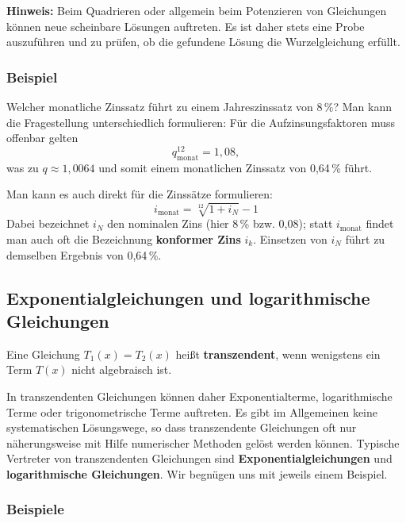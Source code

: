 \textbf{Hinweis:} Beim Quadrieren oder allgemein beim Potenzieren von Gleichungen können neue scheinbare Lösungen auftreten. Es ist daher stets eine Probe auszuführen und zu prüfen, ob die gefundene Lösung die Wurzelgleichung erfüllt.

\subsubsection{Beispiel}

Welcher monatliche Zinssatz führt zu einem Jahreszinssatz von 8\,\%? Man kann die Fragestellung unterschiedlich formulieren: Für die Aufzinsungsfaktoren muss offenbar gelten
\[ q_{\text{monat}}^{12} = 1{,}08 , \]
was zu $q \approx 1{,}0064$ und somit einem monatlichen Zinssatz von 0{,}64\,\% führt.

Man kann es auch direkt für die Zinssätze formulieren:
\[ i_{\text{monat}} = \sqrt[12]{1 + i_N} - 1 \]
Dabei bezeichnet $i_N$ den nominalen Zins (hier 8\,\% bzw. 0{,}08); statt $i_{\text{monat}}$ findet man auch oft die Bezeichnung \textbf{konformer Zins} $i_k$. Einsetzen von $i_N$ führt zu demselben Ergebnis von 0{,}64\,\%.\beispielende

\subsection{Exponentialgleichungen und logarithmische Gleichungen}

Eine Gleichung $T_1(x) = T_2(x)$ heißt \textbf{transzendent}, wenn wenigstens ein Term $T(x)$ nicht algebraisch ist.

In transzendenten Gleichungen können daher Exponentialterme, logarithmische Terme oder trigonometrische Terme auftreten. Es gibt im Allgemeinen keine systematischen Lösungswege, so dass transzendente Gleichungen oft nur näherungsweise mit Hilfe numerischer Methoden gelöst werden können. Typische Vertreter von transzendenten Gleichungen sind \textbf{Exponentialgleichungen} und \textbf{logarithmische Gleichungen}. Wir begnügen uns mit jeweils einem Beispiel.

\subsubsection{Beispiele}

